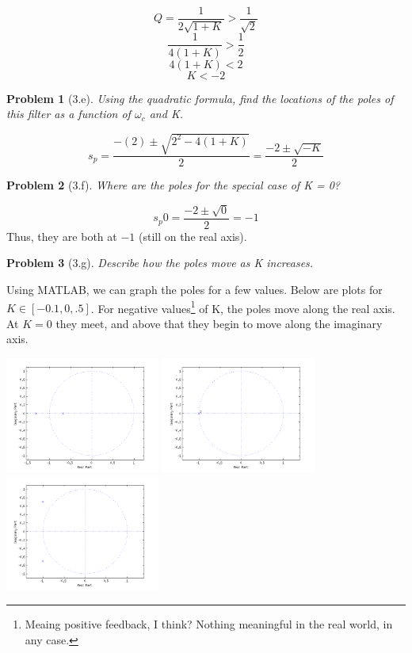 \documentclass[12pt]{article}
\newtheorem*{prob}{Problem}
\begin{document}
\[ Q = \frac{1}{2\sqrt{1+K}} > \frac{1}{\sqrt{2}} \]
\[ \frac{1}{4(1+K)} > \frac{1}{2}  \]
\[ 4(1+K) < 2 \]
\[ K < -2 \]

\begin{prob}[3.e]{
 Using the quadratic formula, find the locations of the poles of this filter as a function of $\omega_c$ and K.
}\end{prob}

\[ s_p = \frac{-(2)\pm \sqrt{2^2 - 4(1+K)}}{2} = \frac{-2\pm \sqrt{-K}}{2} \]

\begin{prob}[3.f]{
Where are the poles for the special case of K = 0?
}\end{prob}
\[ s_p0 = \frac{-2\pm \sqrt{0}}{2} = -1 \]
Thus, they are both at $-1$ (still on the real axis).

\begin{prob}[3.g]{
Describe how the poles move as K increases.
}\end{prob}

Using MATLAB, we can graph the poles for a few values. Below are plots for $K \in [-0.1, 0, .5]$. For negative values\footnote{Meaing positive feedback, I think? Nothing meaningful in the real world, in any case.} of K, the poles move along the real axis. At $K=0$ they meet, and above that they begin to move along the imaginary axis.

\begin{center}
\includegraphics[width=2in]{k-01.png}
\includegraphics[width=2in]{k0.png}
\includegraphics[width=2in]{k05.png}
\end{center}
\end{document}
